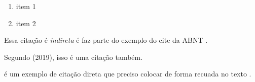 \begin{enumerate}
    \item item 1
    \item item 2
\end{enumerate}


Essa citação é \textit{indireta} é faz parte do exemplo do cite da ABNT \cite{barbieri2019}.

Segundo \citeauthor{barbieri2019} (2019), isso é uma citação também.

\begin{citacao}
é um exemplo de citação direta que preciso colocar de forma recuada no texto \cite[p. 32]{barbieri2019}. 
\end{citacao}